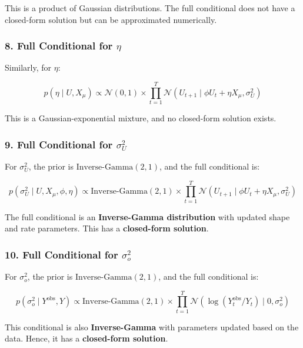 \documentclass[
  letterpaper,
  DIV=11,
  numbers=noendperiod]{scrartcl}
\begin{document}
This is a product of Gaussian distributions. The full conditional does
not have a closed-form solution but can be approximated numerically.

\subsubsection{\texorpdfstring{8. Full Conditional for
\(\eta\)}{8. Full Conditional for \textbackslash eta}}\label{full-conditional-for-eta}

Similarly, for \(\eta\):

\begin{equation}
p(\eta \mid U, X_{\mu}) \propto \mathcal{N}(0, 1) \times \prod_{t=1}^{T} \mathcal{N}(U_{t+1} \mid \phi U_t + \eta X_{\mu}, \sigma_U^2)
\end{equation}

This is a Gaussian-exponential mixture, and no closed-form solution
exists.

\subsubsection{\texorpdfstring{9. Full Conditional for
\(\sigma_U^2\)}{9. Full Conditional for \textbackslash sigma\_U\^{}2}}\label{full-conditional-for-sigma_u2}

For \(\sigma_U^2\), the prior is \(\text{Inverse-Gamma}(2, 1)\), and the
full conditional is:

\begin{equation}
p(\sigma_U^2 \mid U, X_{\mu}, \phi, \eta) \propto \text{Inverse-Gamma}(2, 1) \times \prod_{t=1}^{T} \mathcal{N}(U_{t+1} \mid \phi U_t + \eta X_{\mu}, \sigma_U^2)
\end{equation}

The full conditional is an \textbf{Inverse-Gamma distribution} with
updated shape and rate parameters. This has a \textbf{closed-form
solution}.

\subsubsection{\texorpdfstring{10. Full Conditional for
\(\sigma_o^2\)}{10. Full Conditional for \textbackslash sigma\_o\^{}2}}\label{full-conditional-for-sigma_o2}

For \(\sigma_o^2\), the prior is \(\text{Inverse-Gamma}(2, 1)\), and the
full conditional is:

\begin{equation}
p(\sigma_o^2 \mid Y^{\text{obs}}, Y) \propto \text{Inverse-Gamma}(2, 1) \times \prod_{t=1}^{T} \mathcal{N}(\log(Y_t^{\text{obs}} / Y_t) \mid 0, \sigma_o^2)
\end{equation}

This conditional is also \textbf{Inverse-Gamma} with parameters updated
based on the data. Hence, it has a \textbf{closed-form solution}.
\end{document}
